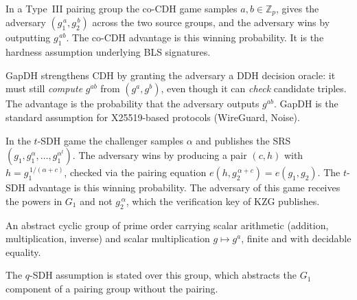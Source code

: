 \begin{definition}
  \label{def:cocdh}
  \leanok
  In a Type~III pairing group the co-CDH game samples $a, b \in \mathbb{Z}_p$,
  gives the adversary $(g_1^{\,a}, g_2^{\,b})$ across the two source groups, and
  the adversary wins by outputting $g_1^{\,ab}$. The co-CDH advantage is this
  winning probability. It is the hardness assumption underlying BLS signatures.
\end{definition}

\begin{definition}
  \label{def:gapdh}
  \leanok
  GapDH strengthens CDH by granting the adversary a DDH decision oracle: it must
  still \emph{compute} $g^{ab}$ from $(g^a, g^b)$, even though it can \emph{check}
  candidate triples. The advantage is the probability that the adversary outputs
  $g^{ab}$. GapDH is the standard assumption for X25519-based protocols
  (WireGuard, Noise).
\end{definition}

\begin{definition}
  \label{def:tsdh}
  \leanok
  In the $t$-SDH game the challenger samples $\alpha$ and publishes the SRS
  $(g_1, g_1^{\alpha}, \dots, g_1^{\alpha^t})$. The adversary wins by producing a
  pair $(c, h)$ with $h = g_1^{\,1/(\alpha + c)}$, checked via the pairing
  equation $e(h, g_2^{\,\alpha + c}) = e(g_1, g_2)$. The $t$-SDH advantage is
  this winning probability. The adversary of this game receives the powers in
  $G_1$ and not $g_2^{\,\alpha}$, which the verification key of KZG publishes.
\end{definition}

\begin{definition}
  \label{def:qsdh-group}
  \leanok
  An abstract cyclic group of prime order carrying scalar arithmetic
  (addition, multiplication, inverse) and scalar multiplication $g \mapsto g^a$,
  finite and with decidable equality.
\end{definition}

The $q$-SDH assumption is stated over this group, which abstracts the $G_1$ component of
a pairing group without the pairing.

